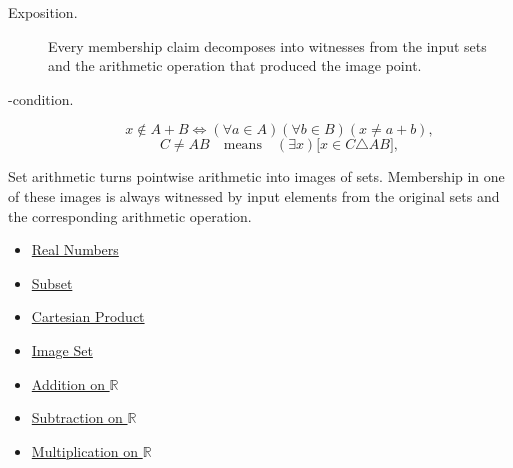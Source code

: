 \begin{remark*}
\begin{description}
  \item[Exposition.]
Every membership claim decomposes into witnesses from the input sets and the
arithmetic operation that produced the image point.


  \item[\exists-condition.]
  \[
x\notin A+B\Longleftrightarrow(\forall a\in A)(\forall b\in B)(x\neq a+b),
\]
\[
C\ne AB
\quad\text{means}\quad
(\exists x)\bigl[x\in C\triangle AB\bigr],
\]
\end{description}
\end{remark*}

\begin{remark*}[Interpretation]
Set arithmetic turns pointwise arithmetic into images of sets. Membership in
one of these images is always witnessed by input elements from the original
sets and the corresponding arithmetic operation.
\end{remark*}

\begin{dependencies}
\begin{itemize}
  \item \hyperref[def:reals]{Real Numbers}
  \item \hyperref[def:subset]{Subset}
  \item \hyperref[def:cartesian-product]{Cartesian Product}
  \item \hyperref[def:image-set]{Image Set}
  \item \hyperref[def:addition-on-r]{Addition on $\mathbb{R}$}
  \item \hyperref[def:subtraction-on-r]{Subtraction on $\mathbb{R}$}
  \item \hyperref[def:multiplication-on-r]{Multiplication on $\mathbb{R}$}
\end{itemize}
\end{dependencies}

